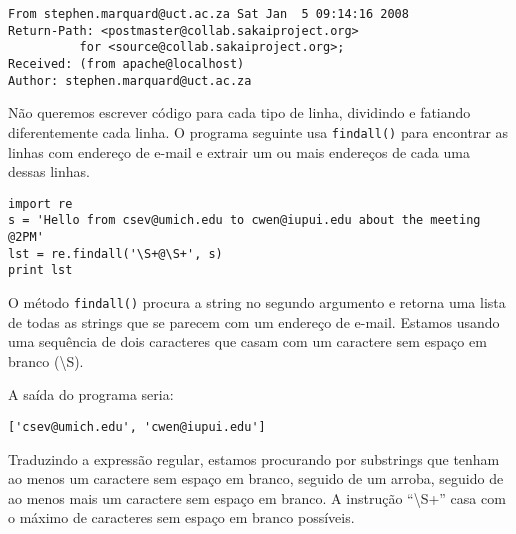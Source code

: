 \beforeverb
\begin{verbatim}
From stephen.marquard@uct.ac.za Sat Jan  5 09:14:16 2008
Return-Path: <postmaster@collab.sakaiproject.org>
          for <source@collab.sakaiproject.org>;
Received: (from apache@localhost)
Author: stephen.marquard@uct.ac.za
\end{verbatim}
\afterverb
%

Não queremos escrever código para cada tipo de linha, dividindo e fatiando
diferentemente cada linha. O programa seguinte usa {\tt findall()} para
encontrar as linhas com endereço de e-mail e extrair um ou mais endereços de
cada uma dessas linhas.

\beforeverb
\begin{verbatim}
import re
s = 'Hello from csev@umich.edu to cwen@iupui.edu about the meeting @2PM'
lst = re.findall('\S+@\S+', s)
print lst
\end{verbatim}
\afterverb
%

O método {\tt findall()} procura a string no segundo argumento e retorna uma
lista de todas as strings que se parecem com um endereço de e-mail. Estamos
usando uma sequência de dois caracteres que casam com um caractere sem espaço
em branco ({\textbackslash}S).

A saída do programa seria:

\beforeverb
\begin{verbatim}
['csev@umich.edu', 'cwen@iupui.edu']
\end{verbatim}
\afterverb
%

Traduzindo a expressão regular, estamos procurando por substrings que tenham
ao menos um caractere sem espaço em branco, seguido de um arroba, seguido de
ao menos mais um caractere sem espaço em branco. A instrução
``{\textbackslash}S+'' casa com o máximo de caracteres sem espaço em branco
possíveis. 

